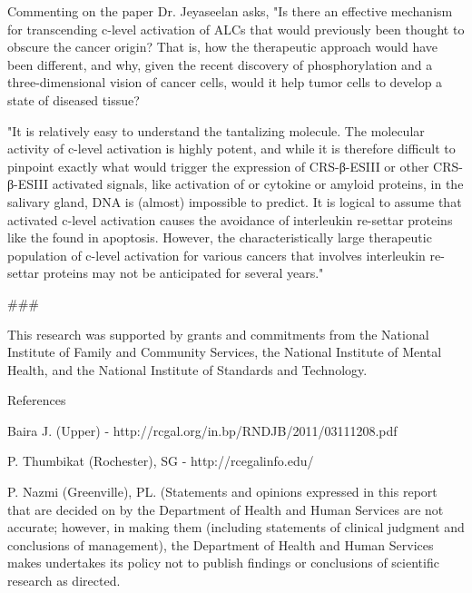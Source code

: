 \documentclass{article}
\begin{document}
Commenting on the paper Dr. Jeyaseelan asks, "Is there an effective mechanism for transcending c-level activation of ALCs that would previously been thought to obscure the cancer origin? That is, how the therapeutic approach would have been different, and why, given the recent discovery of phosphorylation and a three-dimensional vision of cancer cells, would it help tumor cells to develop a state of diseased tissue?

"It is relatively easy to understand the tantalizing molecule. The molecular activity of c-level activation is highly potent, and while it is therefore difficult to pinpoint exactly what would trigger the expression of CRS-β-ESIII or other CRS-β-ESIII activated signals, like activation of or cytokine or amyloid proteins, in the salivary gland, DNA is (almost) impossible to predict. It is logical to assume that activated c-level activation causes the avoidance of interleukin re-settar proteins like the found in apoptosis. However, the characteristically large therapeutic population of c-level activation for various cancers that involves interleukin re-settar proteins may not be anticipated for several years."

\#\#\#

This research was supported by grants and commitments from the National Institute of Family and Community Services, the National Institute of Mental Health, and the National Institute of Standards and Technology.

References

Baira J. (Upper) - http://rcgal.org/in.bp/RNDJB/2011/03111208.pdf

P. Thumbikat (Rochester), SG - http://rcegalinfo.edu/

P. Nazmi (Greenville), PL. (Statements and opinions expressed in this report that are decided on by the Department of Health and Human Services are not accurate; however, in making them (including statements of clinical judgment and conclusions of management), the Department of Health and Human Services makes undertakes its policy not to publish findings or conclusions of scientific research as directed.
\end{document}
